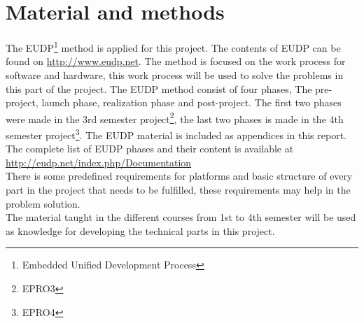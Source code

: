 \chapter{Material and methods}
The EUDP\footnote{Embedded Unified Development Process} method is applied for this project. The contents of EUDP can be found on \url{http://www.eudp.net}. The method is focused on the work process for software and hardware, this work process will be used to solve the problems in this part of the project. The EUDP method consist of four phases, The pre-project, launch phase, realization phase and post-project. The first two phases were made in the 3rd semester project\footnote{EPRO3}, the last two phases is made in the 4th semester project\footnote{EPRO4}. The EUDP material is included as appendices in this report. The complete list of EUDP phases and their content is available at \url{http://eudp.net/index.php/Documentation}\\
There is some predefined requirements for platforms and basic structure of every part in the project that needs to be fulfilled, these requirements may help in the problem solution.\\
The material taught in the different courses from 1st to 4th semester will be used as knowledge for developing the technical parts in this project.\\